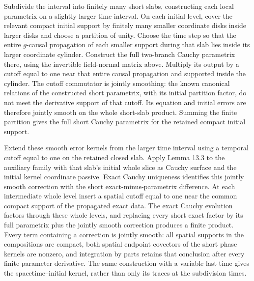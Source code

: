 \documentclass[
  english,
  11pt,
  reqno]{amsart}
\begin{document}
Subdivide the interval into finitely many short slabs, constructing each
local parametrix on a slightly larger time interval. On each initial
level, cover the relevant compact initial support by finitely many
smaller coordinate disks inside larger disks and choose a partition of
unity. Choose the time step so that the entire \(\bar g\)-causal
propagation of each smaller support during that slab lies inside its
larger coordinate cylinder. Construct the full two-branch Cauchy
parametrix there, using the invertible field-normal matrix above.
Multiply its output by a cutoff equal to one near that entire causal
propagation and supported inside the cylinder. The cutoff commutator is
jointly smoothing: the known canonical relations of the constructed
short parametrix, with its initial partition factor, do not meet the
derivative support of that cutoff. Its equation and initial errors are
therefore jointly smooth on the whole short-slab product. Summing the
finite partition gives the full short Cauchy parametrix for the retained
compact initial support.

Extend these smooth error kernels from the larger time interval using a
temporal cutoff equal to one on the retained closed slab. Apply Lemma
13.3 to the auxiliary family with that slab's initial whole slice as
Cauchy surface and the initial kernel coordinate passive. Exact Cauchy
uniqueness identifies this jointly smooth correction with the short
exact-minus-parametrix difference. At each intermediate whole level
insert a spatial cutoff equal to one near the common compact support of
the propagated exact data. The exact Cauchy evolution factors through
these whole levels, and replacing every short exact factor by its full
parametrix plus the jointly smooth correction produces a finite product.
Every term containing a correction is jointly smooth: all spatial
supports in the compositions are compact, both spatial endpoint
covectors of the short phase kernels are nonzero, and integration by
parts retains that conclusion after every finite parameter derivative.
The same construction with a variable last time gives the
spacetime--initial kernel, rather than only its traces at the
subdivision times.
\end{document}
